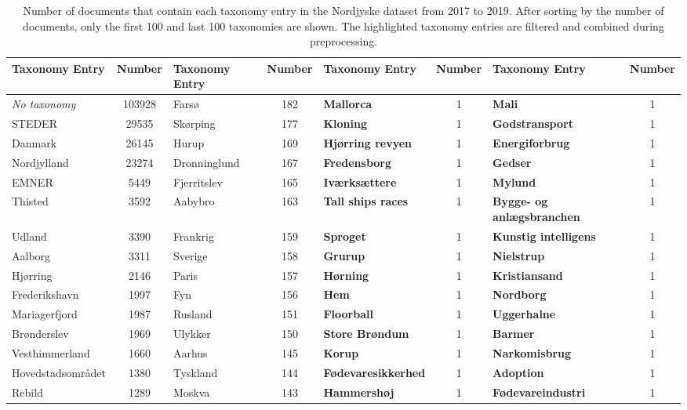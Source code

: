 \begin{table*}[h]
	\caption{Number of documents that contain each taxonomy entry in the Nordjyske dataset from 2017 to 2019.
	After sorting by the number of documents, only the first 100 and last 100 taxonomies are shown.
	The highlighted taxonomy entries are filtered and combined during preprocessing.}
	\label{tab:taxonomy_table}
	\centering
	\scriptsize
	\begin{tabular}{l|c|l|c|l|c|l|c}
		Taxonomy Entry & Number & Taxonomy Entry                    & Number & Taxonomy Entry                       & Number & Taxonomy Entry                      & Number \\
		\midrule
		\emph{No taxonomy} & 103928 & Farsø & 182 & \textbf{Mallorca} & 1 & \textbf{Mali} & 1 \\
		STEDER & 29535 & Skørping & 177 & \textbf{Kloning} & 1 & \textbf{Godstransport} & 1 \\
		Danmark & 26145 & Hurup & 169 & \textbf{Hjørring revyen} & 1 & \textbf{Energiforbrug} & 1 \\
		Nordjylland & 23274 & Dronninglund & 167 & \textbf{Fredensborg} & 1 & \textbf{Gedser} & 1 \\
		EMNER & 5449 & Fjerritslev & 165 & \textbf{Iværksættere} & 1 & \textbf{Mylund} & 1 \\
		Thisted & 3592 & Aabybro & 163 & \textbf{Tall ships races} & 1 & \textbf{Bygge- og anlægsbranchen} & 1 \\
		Udland & 3390 & Frankrig & 159 & \textbf{Sproget} & 1 & \textbf{Kunstig intelligens} & 1 \\
		Aalborg & 3311 & Sverige & 158 & \textbf{Grurup} & 1 & \textbf{Nielstrup} & 1 \\
		Hjørring & 2146 & Paris & 157 & \textbf{Hørning} & 1 & \textbf{Kristiansand} & 1 \\
		Frederikshavn & 1997 & Fyn & 156 & \textbf{Hem} & 1 & \textbf{Nordborg} & 1 \\
		Mariagerfjord & 1987 & Rusland & 151 & \textbf{Floorball} & 1 & \textbf{Uggerhalne} & 1 \\
		Brønderslev & 1969 & Ulykker & 150 & \textbf{Store Brøndum} & 1 & \textbf{Barmer} & 1 \\
		Vesthimmerland & 1660 & Aarhus & 145 & \textbf{Korup} & 1 & \textbf{Narkomisbrug} & 1 \\
		Hovedstadsområdet & 1380 & Tyskland & 144 & \textbf{Fødevaresikkerhed} & 1 & \textbf{Adoption} & 1 \\
		Rebild & 1289 & Moskva & 143 & \textbf{Hammershøj} & 1 & \textbf{Fødevareindustri} & 1 \\

\end{tabular}
\end{table*}
